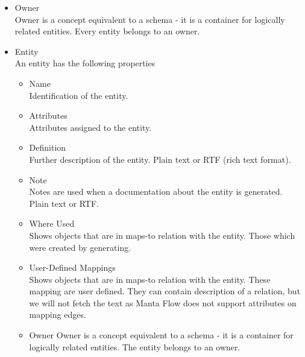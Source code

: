\begin{itemize}
	\item Owner \\ 
	Owner is a concept equivalent to a schema - it is a container for logically related entities. Every entity belongs to an owner.
	\item Entity \\
	An entity has the following properties
	\begin{itemize}
		\item Name \\ 
		Identification of the entity.
		\item Attributes \\ 
		Attributes assigned to the entity.
		\item Definition \\
		Further description of the entity. Plain text or RTF (rich text format).
		\item Note \\
		Notes are used when a documentation about the entity is generated. Plain text or RTF.
		\item Where Used \\
		Shows objects that are in maps-to relation with the entity. Those which were created by generating.
		\item User-Defined Mappings \\
		Shows objects that are in maps-to relation with the entity. These mapping are user defined. They can contain description of a relation, but we will not fetch the text as Manta Flow does not support attributes on mapping edges.
		\item Owner
		Owner is a concept equivalent to a schema - it is a container for logically related entities. The entity belongs to an owner.

\end{itemize}
\end{itemize}
